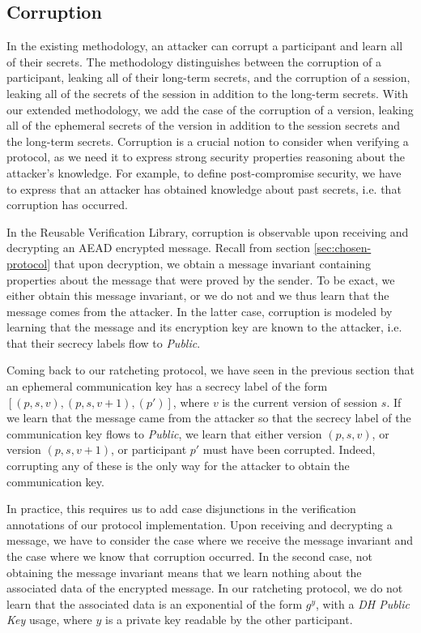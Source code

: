 \subsection{Corruption}

In the existing methodology, an attacker can corrupt a participant and learn all of their secrets.
The methodology distinguishes between the corruption of a participant, leaking all of their long-term secrets, and the corruption of a session, leaking all of the secrets of the session in addition to the long-term secrets.
With our extended methodology, we add the case of the corruption of a version, leaking all of the ephemeral secrets of the version in addition to the session secrets and the long-term secrets.
Corruption is a crucial notion to consider when verifying a protocol, as we need it to express strong security properties reasoning about the attacker's knowledge.
For example, to define post-compromise security, we have to express that an attacker has obtained knowledge about past secrets, i.e. that corruption has occurred.

In the Reusable Verification Library, corruption is observable upon receiving and decrypting an AEAD encrypted message. 
Recall from section \ref{sec:chosen-protocol} that upon decryption, we obtain a message invariant containing properties about the message that were proved by the sender.
To be exact, we either obtain this message invariant, or we do not and we thus learn that the message comes from the attacker.
In the latter case, corruption is modeled by learning that the message and its encryption key are known to the attacker, i.e. that their secrecy labels flow to \emph{Public}.

Coming back to our ratcheting protocol, we have seen in the previous section that an ephemeral communication key has a secrecy label of the form $[(p,s,v),(p,s,v+1),(p')]$, where $v$ is the current version of session $s$.
If we learn that the message came from the attacker so that the secrecy label of the communication key flows to \emph{Public}, we learn that either version $(p,s,v)$, or version $(p,s,v+1)$, or participant $p'$ must have been corrupted.
Indeed, corrupting any of these is the only way for the attacker to obtain the communication key.

In practice, this requires us to add case disjunctions in the verification annotations of our protocol implementation.
Upon receiving and decrypting a message, we have to consider the case where we receive the message invariant and the case where we know that corruption occurred.
In the second case, not obtaining the message invariant means that we learn nothing about the associated data of the encrypted message. In our ratcheting protocol, we do not learn that the associated data is an exponential of the form $g^y$, with a \emph{DH Public Key} usage, where $y$ is a private key readable by the other participant.

